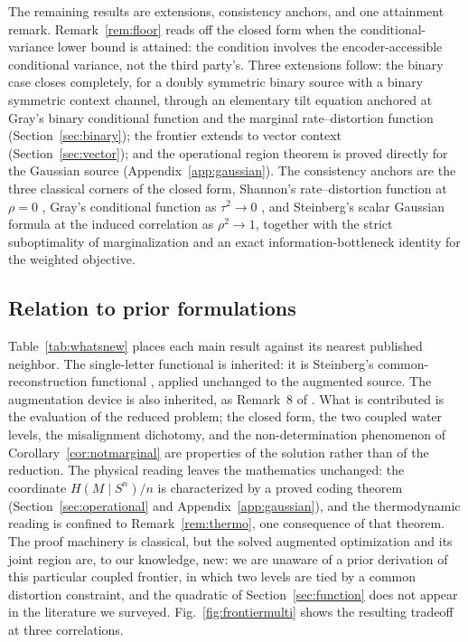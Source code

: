 \documentclass[11pt,onecolumn]{IEEEtran}
\begin{document}
The remaining results are extensions, consistency anchors, and one
attainment remark. Remark~\ref{rem:floor} reads off the closed form when
the conditional-variance lower bound is attained: the condition involves the encoder-accessible
conditional variance, not the third party's. Three extensions follow: the binary
case closes completely, for a doubly symmetric binary source with a
binary symmetric context channel, through an elementary tilt equation
anchored at Gray's binary conditional function and the marginal
rate--distortion function (Section~\ref{sec:binary}); the frontier
extends to vector context (Section~\ref{sec:vector}); and the operational
region theorem is proved directly for the Gaussian source
(Appendix~\ref{app:gaussian}). The consistency anchors are the three
classical corners of the closed form, Shannon's rate--distortion function
at $\rho=0$ \cite{shannon1959}, Gray's conditional function as
$\tau^2\to0$ \cite{gray1973}, and Steinberg's scalar Gaussian formula at
the induced correlation as $\rho^2\to1$, together with the strict
suboptimality of marginalization and an exact information-bottleneck
identity for the weighted objective.

\subsection*{Relation to prior formulations}

Table~\ref{tab:whatsnew} places each main result against its nearest
published neighbor. The single-letter functional is inherited: it is
Steinberg's common-reconstruction functional \cite{steinberg2009},
applied unchanged to the augmented source. The augmentation device is
also inherited, as Remark~8 of \cite{lapidoth2014}. What is contributed
is the evaluation of the reduced problem; the closed form, the two
coupled water levels, the misalignment dichotomy, and the
non-determination phenomenon of Corollary~\ref{cor:notmarginal} are
properties of the solution rather than of the reduction. The physical
reading leaves the mathematics unchanged: the coordinate
$H(M\mid S^n)/n$ is characterized by a proved coding theorem
(Section~\ref{sec:operational} and Appendix~\ref{app:gaussian}), and
the thermodynamic reading is confined to Remark~\ref{rem:thermo}, one
consequence of that theorem. The proof
machinery is classical, but the solved augmented optimization and its
joint region are, to our knowledge, new: we are unaware of a prior
derivation of this particular coupled frontier, in which two levels are
tied by a common distortion constraint, and the quadratic of
Section~\ref{sec:function} does not appear in the literature we surveyed.
Fig.~\ref{fig:frontiermulti} shows the resulting tradeoff at three
correlations.
\end{document}

